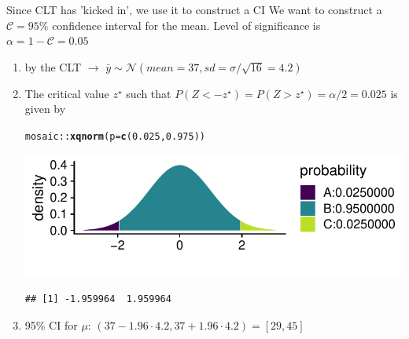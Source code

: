 \documentclass[10pt]{beamer}\usepackage[]{graphicx}\usepackage[]{color}
\makeatletter
\def\maxwidth{ %
  \ifdim\Gin@nat@width>\linewidth
    \linewidth
  \else
    \Gin@nat@width
  \fi
}
\newcommand{\hlnum}[1]{\textcolor[rgb]{0.686,0.059,0.569}{#1}}%
\newcommand{\hlopt}[1]{\textcolor[rgb]{0,0,0}{#1}}%
\newcommand{\hlstd}[1]{\textcolor[rgb]{0.345,0.345,0.345}{#1}}%
\newcommand{\hlkwc}[1]{\textcolor[rgb]{0.333,0.667,0.333}{#1}}%
\newcommand{\hlkwd}[1]{\textcolor[rgb]{0.737,0.353,0.396}{\textbf{#1}}}%
\newenvironment{kframe}{%
 \def\at@end@of@kframe{}%
 \ifinner\ifhmode%
  \def\at@end@of@kframe{\end{minipage}}%
  \begin{minipage}{\columnwidth}%
 \fi\fi%
 \def\FrameCommand##1{\hskip\@totalleftmargin \hskip-\fboxsep
 \colorbox{shadecolor}{##1}\hskip-\fboxsep
     \hskip-\linewidth \hskip-\@totalleftmargin \hskip\columnwidth}%
 \MakeFramed {\advance\hsize-\width
   \@totalleftmargin\z@ \linewidth\hsize
   \@setminipage}}%
 {\par\unskip\endMakeFramed%
 \at@end@of@kframe}
\newenvironment{knitrout}{}{} %
\makeatother
\begin{document}
\begin{frame}[fragile]{Since CLT has 'kicked in', we use it to construct a CI}
	\small
	We want to construct a $\mathcal{C} = 95\%$ confidence interval for the mean. Level of significance is $\alpha = 1-\mathcal{C} = 0.05$ \pause
	
	\begin{enumerate}
		\setlength\itemsep{1em}
		\item by the CLT $\to$ $\bar{y} \sim \mathcal{N}(mean = 37, sd = \sigma/\sqrt{16} = 4.2)$ \pause
		\item The critical value $z^\star$ such that $P(Z < -z^\star) = P(Z > z^\star) = \alpha/2 = 0.025$ is given by 
\begin{knitrout}\tiny
{}\color{fgcolor}\begin{kframe}
\begin{alltt}
\hlstd{mosaic}\hlopt{::}\hlkwd{xqnorm}\hlstd{(}\hlkwc{p} \hlstd{=} \hlkwd{c}\hlstd{(}\hlnum{0.025}\hlstd{,} \hlnum{0.975}\hlstd{))}
\end{alltt}
\end{kframe}

{\centering \includegraphics[width=\maxwidth]{figure/unnamed-chunk-4-1} 

}


\begin{kframe}\begin{verbatim}
## [1] -1.959964  1.959964
\end{verbatim}
\end{kframe}
\end{knitrout}
		\pause
		\item 95\% CI for $\mu$: $(37 - 1.96 \cdot 4.2, 37 + 1.96 \cdot 4.2) = [29, 45]$
	\end{enumerate}
\end{frame}
\end{document}
